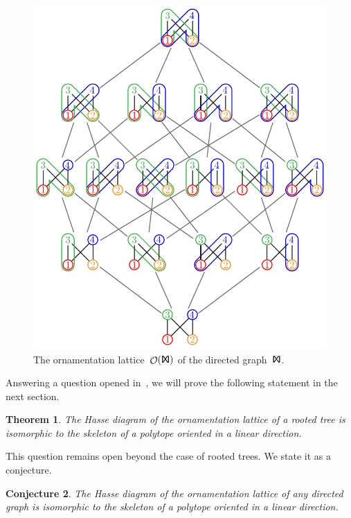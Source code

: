 \documentclass{amsart}
\newtheorem{theorem}{Theorem}[section]
\newtheorem{conjecture}[theorem]{Conjecture}
\theoremstyle{definition}
\renewcommand{\c}[1]{\mathcal{#1}} %
\DeclareMathOperator{\Orn}{\c{O}}  %
\newcommand{\Tgraph}{\sf I\!X\!I} %
\begin{document}
\begin{figure}
	\centerline{\includegraphics[scale=.8]{ornamentationsT}}
	\caption{The ornamentation lattice~$\Orn(\Tgraph)$ of the directed graph~$\Tgraph$.}
	\label{fig:ornamentationsT}
\end{figure}

Answering a question opened in~\cite{DelfantSack}, we will prove the following statement in the next section.

\begin{theorem}
The Hasse diagram of the ornamentation lattice of a rooted tree is isomorphic to the skeleton of a polytope oriented in a linear direction. 
\end{theorem}

This question remains open beyond the case of rooted trees.
We state it as a conjecture.

\begin{conjecture}
The Hasse diagram of the ornamentation lattice of any directed graph is isomorphic to the skeleton of a polytope oriented in a linear direction. 
\end{conjecture}
\end{document}
